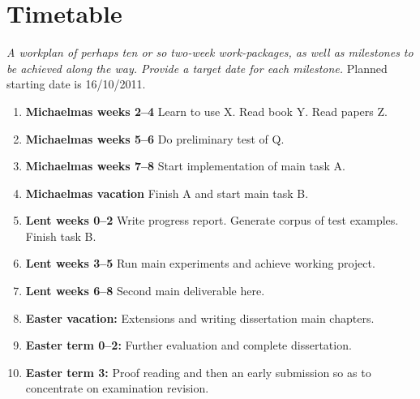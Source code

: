 \documentclass[12pt,a4paper,twoside]{article}
\begin{document}
\section*{Timetable}
\emph{A workplan of perhaps ten or so two-week work-packages,
as well as milestones to be achieved along the way. Provide a
target date for each milestone.}
Planned starting date is 16/10/2011.
\begin{enumerate}
\item \textbf{Michaelmas weeks 2--4} Learn to use X. Read book Y. Read papers Z.
\item \textbf{Michaelmas weeks 5--6} Do preliminary test of Q.
\item \textbf{Michaelmas weeks 7--8} Start implementation of main task A.
\item \textbf{Michaelmas vacation} Finish A and start main task B.
\item \textbf{Lent weeks 0--2} Write progress report. Generate corpus of
test examples. Finish task B.
\item \textbf{Lent weeks 3--5} Run main experiments and achieve working project.
\item \textbf{Lent weeks 6--8} Second main deliverable here.
\item \textbf{Easter vacation:} Extensions and writing dissertation main
chapters.
\item \textbf{Easter term 0--2:} Further evaluation and complete dissertation.
\item \textbf{Easter term 3:} Proof reading and then an early submission
so as to concentrate on examination revision.
\end{enumerate}
\end{document}
